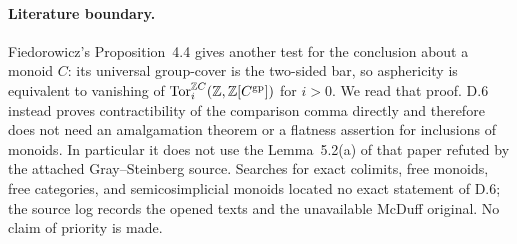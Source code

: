 \paragraph{Literature boundary.}
Fiedorowicz's Proposition~4.4 \cite{CDFiedorowicz1984} gives
another test for the conclusion about a monoid $C$: its
universal group-cover is the two-sided bar, so asphericity is
equivalent to vanishing of
$\operatorname{Tor}_i^{\mathbb Z C}(\mathbb Z,\mathbb Z[C^{\mathrm{gp}}])$ for $i>0$.
We read that proof. D.6 instead proves contractibility of the
comparison comma directly and therefore does not need an
amalgamation theorem or a flatness assertion for inclusions of
monoids. In particular it does not use the Lemma~5.2(a) of that
paper refuted by the attached Gray--Steinberg source. Searches
for exact colimits, free monoids, free categories, and
semicosimplicial monoids located no exact statement of D.6;
the source log records the opened texts and the unavailable
McDuff original. No claim of priority is made.
